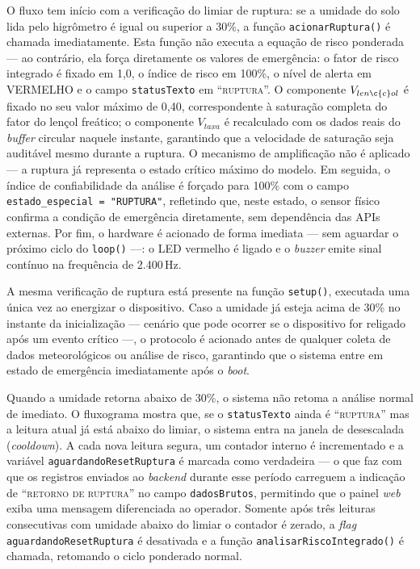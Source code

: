 O fluxo tem início com a verificação do limiar de ruptura: se a
umidade do solo lida pelo higrômetro é igual ou superior a 30\%,
a função \texttt{acionarRuptura()} é chamada imediatamente. Esta
função não executa a equação de risco ponderada — ao contrário, ela
força diretamente os valores de emergência: o fator de risco
integrado é fixado em 1,0, o índice de risco em 100\%, o nível de
alerta em VERMELHO e o campo \texttt{statusTexto} em
``\textsc{ruptura}''. O componente $V_{len\c{c}ol}$ é fixado no seu
valor máximo de 0,40, correspondente à saturação completa do fator
do lençol freático; o componente $V_{taxa}$ é recalculado com os
dados reais do \textit{buffer} circular naquele instante, garantindo
que a velocidade de saturação seja auditável mesmo durante a ruptura.
O mecanismo de amplificação não é aplicado — a ruptura já representa
o estado crítico máximo do modelo. Em seguida, o índice de
confiabilidade da análise é forçado para 100\% com o campo
\texttt{estado\_especial = "RUPTURA"}, refletindo que, neste estado,
o sensor físico confirma a condição de emergência diretamente, sem
dependência das APIs externas. Por fim, o hardware é acionado de
forma imediata — sem aguardar o próximo ciclo do
\texttt{loop()} —: o LED vermelho é ligado e o \textit{buzzer} emite
sinal contínuo na frequência de 2.400\,Hz.

A mesma verificação de ruptura está presente na função
\texttt{setup()}, executada uma única vez ao energizar o dispositivo.
Caso a umidade já esteja acima de 30\% no instante da inicialização
— cenário que pode ocorrer se o dispositivo for religado após um
evento crítico —, o protocolo é acionado antes de qualquer coleta
de dados meteorológicos ou análise de risco, garantindo que o
sistema entre em estado de emergência imediatamente após o
\textit{boot}.

Quando a umidade retorna abaixo de 30\%, o sistema não retoma a
análise normal de imediato. O fluxograma mostra que, se o
\texttt{statusTexto} ainda é ``\textsc{ruptura}'' mas a leitura
atual já está abaixo do limiar, o sistema entra na janela de
desescalada (\textit{cooldown}). A cada nova leitura segura, um
contador interno é incrementado e a variável
\texttt{aguardandoResetRuptura} é marcada como verdadeira — o que
faz com que os registros enviados ao \textit{backend} durante esse
período carreguem a indicação de ``\textsc{retorno de ruptura}'' no
campo \texttt{dadosBrutos}, permitindo que o painel \textit{web}
exiba uma mensagem diferenciada ao operador. Somente após três
leituras consecutivas com umidade abaixo do limiar o contador é
zerado, a \textit{flag} \texttt{aguardandoResetRuptura} é desativada
e a função \texttt{analisarRiscoIntegrado()} é chamada, retomando o
ciclo ponderado normal.

